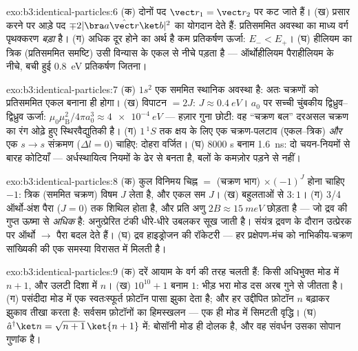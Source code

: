 \begin{solution}{exo:b3:identical-particles:6}
(क) दोनों पद $\vect r_1 = \vect r_2$ पर कट जाते हैं। (ख) प्रसार करने
पर आड़े पद $\mp2|\bra a\hat{\vect r}\ket b|^2$ का योगदान देते हैं:
प्रतिसममित अवस्था का माध्य वर्ग पृथक्करण \emph{बड़ा} है। (ग) अधिक दूर
होने का अर्थ है कम प्रतिकर्षण ऊर्जा: $E_- <
E_+$। (घ) हीलियम का त्रिक (प्रतिसममित समष्टि) उसी विन्यास के एकल से
नीचे पड़ता है --- ऑर्थोहीलियम पैराहीलियम के नीचे, बची हुई
\qty{0.8}{eV} प्रतिकर्षण जितना।
\end{solution}

\begin{solution}{exo:b3:identical-particles:7}
(क) $1s^2$ एक सममित स्थानिक अवस्था है: अतः चक्रणों को प्रतिसममित एकल
बनाना ही होगा। (ख) विपाटन $= 2J$: $J \approx
\qty{0.4}{eV}$। $a_0$ पर सच्ची चुंबकीय द्विध्रुव--द्विध्रुव ऊर्जा:
$\mu_0\mu_{\text{B}}^2/4\pi a_0^3 \approx \qty{4e-4}{eV}$
--- हज़ार गुना छोटी: वह ``चक्रण बल'' दरअसल चक्रण का रंग ओढ़े हुए
स्थिरवैद्युतिकी है। (ग) $1\,^1S$ तक क्षय के लिए एक चक्रण-पलटाव
(एकल--त्रिक) \emph{और} एक $s \to s$ संक्रमण ($\Delta l =
0$) चाहिए: दोहरा वर्जित। (घ) $8000$ s बनाम \qty{1.6}{ns}: दो
चयन-नियमों से बारह कोटियाँ --- अर्धस्थायित्व नियमों के ढेर से बनता है,
बलों के कमज़ोर पड़ने से नहीं।
\end{solution}

\begin{solution}{exo:b3:identical-particles:8}
(क) कुल विनिमय चिह्न $=$ (चक्रण भाग) $\times (-1)^J$ होना चाहिए
$-1$: त्रिक (सममित चक्रण) विषम $J$ लेता है, और एकल सम $J$।
(ख) बहुलताओं से $3:1$। (ग) 3/4 ऑर्थो-अंश
पैरा ($J = 0$) तक शिथिल होता है, और प्रति अणु $2B \approx \qty{15}{meV}$
छोड़ता है --- जो द्रव की गुप्त ऊष्मा से \emph{अधिक} है:
अनुत्प्रेरित टंकी धीरे-धीरे उबलकर सूख जाती है। संयंत्र द्रवण के दौरान
उत्प्रेरक पर ऑर्थो $\to$ पैरा बदल देते हैं। (घ) द्रव
हाइड्रोजन की रॉकेटरी --- हर प्रक्षेपण-मंच को नाभिकीय-चक्रण
सांख्यिकी की एक समस्या विरासत में मिलती है।
\end{solution}

\begin{solution}{exo:b3:identical-particles:9}
(क) दरें आयाम के वर्ग की तरह चलती हैं: किसी अधिभुक्त मोड में $n + 1$,
और उलटी दिशा में $n$। (ख) $10^{10} + 1$ बनाम $1$: भीड़ भरा मोड दस
अरब गुने से जीतता है। (ग) पसंदीदा मोड में एक स्वतःस्फूर्त फ़ोटॉन
पासा झुका देता है; और हर उद्दीपित फ़ोटॉन
$n$ बढ़ाकर झुकाव तीखा करता है: सर्वसम फ़ोटॉनों का हिमस्खलन ---
एक ही मोड में सिमटती वृद्धि। (घ) $\hat a^\dagger\ket n =
\sqrt{n+1}\,\ket{n+1}$ में: बोसॉनी मोड ही दोलक है, और
वह संवर्धन उसका सोपान गुणांक है।
\end{solution}

